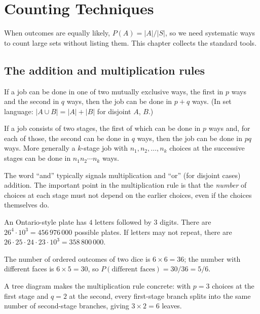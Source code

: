 \chapter{Counting Techniques}

When outcomes are equally likely, $P(A) = |A|/|S|$, so we need systematic ways to count
large sets without listing them. This chapter collects the standard tools.

\section{The addition and multiplication rules}

\begin{theorem}
If a job can be done in one of two mutually exclusive ways, the first in $p$ ways and the
second in $q$ ways, then the job can be done in $p+q$ ways. (In set language:
$|A\cup B| = |A|+|B|$ for disjoint $A$, $B$.)
\end{theorem}

\begin{theorem}
If a job consists of two stages, the first of which can be done in $p$ ways and, for each
of those, the second can be done in $q$ ways, then the job can be done in $pq$ ways. More
generally a $k$-stage job with $n_1, n_2, \dots, n_k$ choices at the successive stages can
be done in $n_1 n_2\cdots n_k$ ways.
\end{theorem}

The word ``and'' typically signals multiplication and ``or'' (for disjoint cases) addition.
The important point in the multiplication rule is that the \emph{number} of choices at
each stage must not depend on the earlier choices, even if the choices themselves do.

\begin{example}
An Ontario-style plate has $4$ letters followed by $3$ digits. There are
$26^4 \cdot 10^3 = 456\,976\,000$ possible plates. If letters may not repeat, there are
$26\cdot 25\cdot 24\cdot 23 \cdot 10^3 = 358\,800\,000$.
\end{example}

\begin{example}
The number of ordered outcomes of two dice is $6\times 6 = 36$; the number with
different faces is $6\times 5 = 30$, so $P(\text{different faces}) = 30/36 = 5/6$.
\end{example}


A tree diagram makes the multiplication rule concrete: with $p=3$ choices at the first
stage and $q=2$ at the second, every first-stage branch splits into the same number of
second-stage branches, giving $3\times2 = 6$ leaves.

